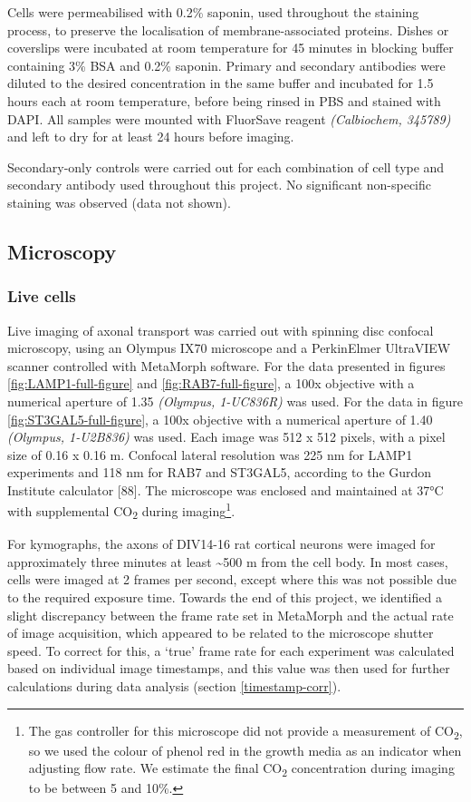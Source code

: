 \documentclass[
  12pt,
  a4paper,
]{book}
\begin{document}
Cells were permeabilised with 0.2\% saponin, used throughout the staining process, to preserve the localisation of membrane-associated proteins. Dishes or coverslips were incubated at room temperature for 45 minutes in blocking buffer containing 3\% BSA and 0.2\% saponin. Primary and secondary antibodies were diluted to the desired concentration in the same buffer and incubated for 1.5 hours each at room temperature, before being rinsed in PBS and stained with DAPI. All samples were mounted with FluorSave reagent \emph{(Calbiochem, 345789)} and left to dry for at least 24 hours before imaging.

Secondary-only controls were carried out for each combination of cell type and secondary antibody used throughout this project. No significant non-specific staining was observed (data not shown).

\subsection{Microscopy}\label{microscopy}

\subsubsection{Live cells}\label{live-imaging}

Live imaging of axonal transport was carried out with spinning disc confocal microscopy, using an Olympus IX70 microscope and a PerkinElmer UltraVIEW scanner controlled with MetaMorph software. For the data presented in figures \ref{fig:LAMP1-full-figure} and \ref{fig:RAB7-full-figure}, a 100x objective with a numerical aperture of 1.35 \emph{(Olympus, 1-UC836R)} was used. For the data in figure \ref{fig:ST3GAL5-full-figure}, a 100x objective with a numerical aperture of 1.40 \emph{(Olympus, 1-U2B836)} was used. Each image was 512 x 512 pixels, with a pixel size of 0.16 x 0.16 \textmu{}m. Confocal lateral resolution was 225 nm for LAMP1 experiments and 118 nm for RAB7 and ST3GAL5, according to the Gurdon Institute calculator {[}88{]}. The microscope was enclosed and maintained at 37°C with supplemental CO\textsubscript{2} during imaging\footnote{The gas controller for this microscope did not provide a measurement of CO\textsubscript{2}, so we used the colour of phenol red in the growth media as an indicator when adjusting flow rate. We estimate the final CO\textsubscript{2} concentration during imaging to be between 5 and 10\%.}.

For kymographs, the axons of DIV14-16 rat cortical neurons were imaged for approximately three minutes at least \textasciitilde500 \textmu{}m from the cell body. In most cases, cells were imaged at 2 frames per second, except where this was not possible due to the required exposure time. Towards the end of this project, we identified a slight discrepancy between the frame rate set in MetaMorph and the actual rate of image acquisition, which appeared to be related to the microscope shutter speed. To correct for this, a `true' frame rate for each experiment was calculated based on individual image timestamps, and this value was then used for further calculations during data analysis (section \ref{timestamp-corr}).
\end{document}
